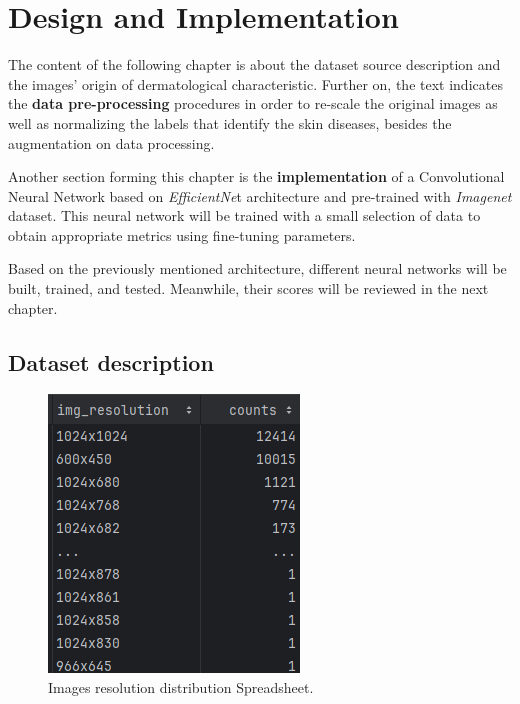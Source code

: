 \chapter{Design and Implementation}
\label{chapter: Design and implementation}
The content of the following chapter is about the dataset source description and the images' origin of dermatological characteristic. Further on, the text indicates the \textbf{data pre-processing} procedures in order to re-scale the original images as well as normalizing the labels that identify the skin diseases,  besides the augmentation on data processing. 

Another section forming this chapter is the\textbf{ implementation} of a Convolutional Neural Network based on \textit{EfficientNe}t architecture and pre-trained with \textit{Imagenet} dataset. This neural network will be trained with a small selection of data to obtain appropriate metrics using fine-tuning parameters.

Based on the previously mentioned architecture, different neural networks will be built, trained, and tested. Meanwhile, their scores will be reviewed in the next chapter. 


\section{Dataset description}

\begin{figure} 
    \vspace{-20pt}
    \centering
        \includegraphics[scale=0.75 ]{images/Building/resolution_list.png}
        \caption{Images resolution distribution Spreadsheet.}
    \label{fig:Spreadsheet_resolution_images}
    \vspace{-100pt}
\end{figure}

